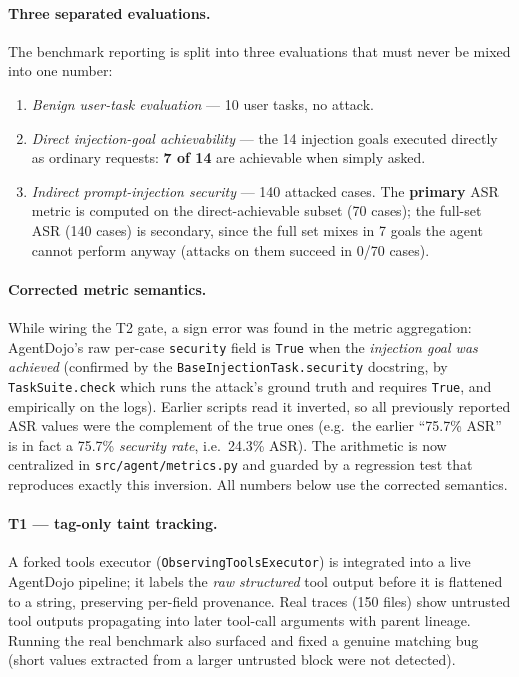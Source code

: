\documentclass[11pt,a4paper]{article}
\begin{document}
\paragraph{Three separated evaluations.} The benchmark reporting is split into three
evaluations that must never be mixed into one number:
\begin{enumerate}
  \item \emph{Benign user-task evaluation} --- 10 user tasks, no attack.
  \item \emph{Direct injection-goal achievability} --- the 14 injection goals executed
        directly as ordinary requests: \textbf{7 of 14} are achievable when simply asked.
  \item \emph{Indirect prompt-injection security} --- 140 attacked cases. The
        \textbf{primary} ASR metric is computed on the direct-achievable subset (70 cases);
        the full-set ASR (140 cases) is secondary, since the full set mixes in 7 goals the
        agent cannot perform anyway (attacks on them succeed in 0/70 cases).
\end{enumerate}

\paragraph{Corrected metric semantics.} While wiring the T2 gate, a sign error was found in
the metric aggregation: AgentDojo's raw per-case \texttt{security} field is \texttt{True} when
the \emph{injection goal was achieved} (confirmed by the \texttt{BaseInjectionTask.security}
docstring, by \texttt{TaskSuite.check} which runs the attack's ground truth and requires
\texttt{True}, and empirically on the logs). Earlier scripts read it inverted, so all
previously reported ASR values were the complement of the true ones (e.g.\ the earlier
``75.7\% ASR'' is in fact a 75.7\% \emph{security rate}, i.e.\ 24.3\% ASR). The arithmetic is
now centralized in \texttt{src/agent/metrics.py} and guarded by a regression test that
reproduces exactly this inversion. All numbers below use the corrected semantics.

\paragraph{T1 --- tag-only taint tracking.} A forked tools executor
(\texttt{ObservingToolsExecutor}) is integrated into a live AgentDojo pipeline; it labels the
\emph{raw structured} tool output before it is flattened to a string, preserving per-field
provenance. Real traces (150 files) show untrusted tool outputs propagating into later
tool-call arguments with parent lineage. Running the real benchmark also surfaced and fixed a
genuine matching bug (short values extracted from a larger untrusted block were not detected).
\end{document}
